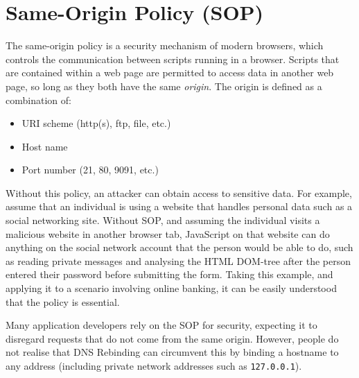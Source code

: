 \chapter{Same-Origin Policy (SOP)}

The same-origin policy is a security mechanism of modern browsers, which
controls the communication between scripts running in a browser. Scripts that
are contained within a web page are permitted to access data in another web
page, so long as they both have the same \emph{origin}. The origin is defined
as a combination of:
\begin{itemize}
	\item{URI scheme (http(s), ftp, file, etc.)}
	\item{Host name}
	\item{Port number (21, 80, 9091, etc.)}
\end{itemize}

Without this policy, an attacker can obtain access to sensitive data. For
example, assume that an individual is using a website that handles personal
data such as a social networking site. Without SOP, and assuming the
individual visits a malicious website in another browser tab, JavaScript on
that website can do anything on the social network account that the person
would be able to do, such as reading private messages and analysing the HTML
DOM-tree after the person entered their password before submitting the form.
Taking this example, and applying it to a scenario involving online banking, it
can be easily understood that the policy is essential.

\vspace{0.5cm}

Many application developers rely on the SOP for security, expecting it to
disregard requests that do not come from the same origin. However, people do
not realise that DNS Rebinding can circumvent this by binding a hostname to
any address (including private network addresses such as \texttt{127.0.0.1}).
